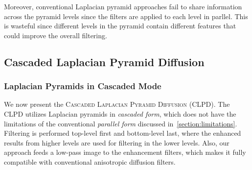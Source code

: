 Moreover, conventional Laplacian pyramid approaches fail to share information across the pyramid levels since the filters are applied to each level in parllel.
This is wasteful since different levels in the pyramid contain different features that could improve the overall filtering.

\subsection{Cascaded Laplacian Pyramid Diffusion}
\subsubsection{Laplacian Pyramids in Cascaded Mode}
We now present the \textsc{Cascaded Laplacian Pyramid Diffusion} (CLPD).
The CLPD utilizes Laplacian pyramids in \textit{cascaded form}, which does not have the limitations of the conventional \textit{parallel form} discussed in~\cref{section:limitations}.
Filtering is performed top-level first and bottom-level last, where the enhanced results from higher levels are used for filtering in the lower levels.
Also, our approach feeds a low-pass image to the enhancement filters, which makes it fully compatible with conventional anisotropic diffusion filters.

